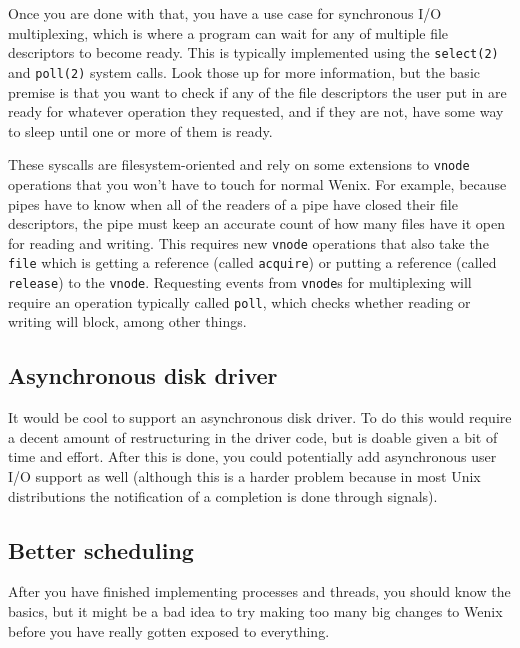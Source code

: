 Once you are done with that, you have a use case for synchronous I/O multiplexing, which is where a program can wait for any of multiple file descriptors to become ready. This is typically implemented using the \texttt{select(2)} and \texttt{poll(2)} system calls. Look those up for more information, but the basic premise is that you want to check if any of the file descriptors the user put in are ready for whatever operation they requested, and if they are not, have some way to sleep until one or more of them is ready.

These syscalls are filesystem-oriented and rely on some extensions to \texttt{vnode} operations that you won't have to touch for normal Wenix. For example, because pipes have to know when all of the readers of a pipe have closed their file descriptors, the pipe must keep an accurate count of how many files have it open for reading and writing. This requires new \texttt{vnode} operations that also take the \texttt{file} which is getting a reference (called \texttt{acquire}) or putting a reference (called \texttt{release}) to the \texttt{vnode}. Requesting events from \texttt{vnode}s for multiplexing will require an operation typically called \texttt{poll}, which checks whether reading or writing will block, among other things.

\subsection{Asynchronous disk driver}
It would be cool to support an asynchronous disk driver. To do this would require a decent amount of restructuring in the driver code, but is doable given a bit of time and effort. After this is done, you could potentially add asynchronous user I/O support as well (although this is a harder problem because in most Unix distributions the notification of a completion is done through signals).

\subsection{Better scheduling}
After you have finished implementing processes and threads, you should know the basics, but it might be a bad idea to try making too many big changes to Wenix before you have really gotten exposed to everything. %

